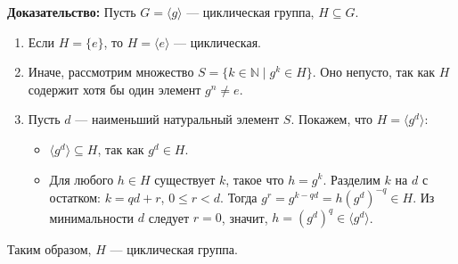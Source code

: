 \documentclass[a4paper]{article}
\renewcommand{\leq}{\leqslant}
\begin{document}
\begin{enumerate}
    \textbf{Доказательство:}
    Пусть \( G = \langle g \rangle \) — циклическая группа, \( H \subseteq G \).
    
    \begin{enumerate}
        \item Если \( H = \{e\} \), то \( H = \langle e \rangle \) — циклическая.
        \item Иначе, рассмотрим множество \( S = \{k \in \mathbb{N} \mid g^k \in H\} \). Оно непусто, так как \( H \) содержит хотя бы один элемент \( g^n \neq e \).
        \item Пусть \( d \) — наименьший натуральный элемент \( S \). Покажем, что \( H = \langle g^d \rangle \):
        \begin{itemize}
            \item \( \langle g^d \rangle \subseteq H \), так как \( g^d \in H \).
            \item Для любого \( h \in H \) существует \( k \), такое что \( h = g^k \). Разделим \( k \) на \( d \) с остатком: \( k = qd + r \), \( 0 \leq r < d \). Тогда \( g^r = g^{k - qd} = h (g^d)^{-q} \in H \). Из минимальности \( d \) следует \( r = 0 \), значит, \( h = (g^d)^q \in \langle g^d \rangle \).
        \end{itemize}
    \end{enumerate}
    
    Таким образом, \( H \) — циклическая группа.
    
\end{enumerate}
\end{document}
